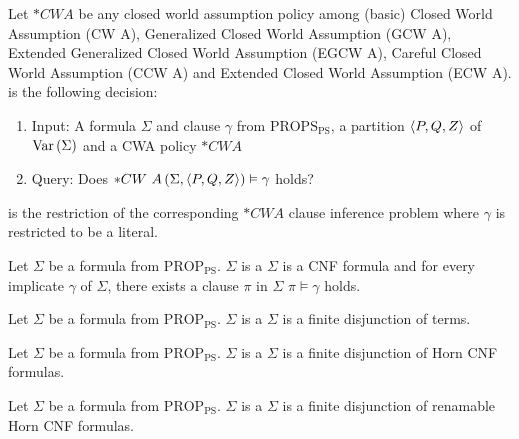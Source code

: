 \begin{defi}
Let $*CWA$ be any closed world assumption policy among (basic) Closed World Assumption (CW A), Generalized Closed World Assumption (GCW A), Extended Generalized Closed World Assumption (EGCW A), Careful Closed World Assumption (CCW A) and Extended Closed World Assumption (ECW A).   is the following decision:
\begin{enumerate}
 \item Input: A formula $\Sigma$ and clause $\gamma$ from $\mbox{PROPS}_{\mbox{PS}}$, a partition $\left\langle P,Q,Z\right\rangle$ of $\mbox{Var}\left(\Sigma\right)$ and a CWA policy $*CWA$
 \item Query: Does $\fun{*CW\ A}{\Sigma,\tuple{P,Q,Z}}\vDash\gamma$ holds?
\end{enumerate}
 is the restriction of the corresponding $*CWA$ clause inference problem where $\gamma$ is restricted to be a literal.
\cite{conf/ijcai/Coste-MarquisM99}
\end{defi}

\begin{defi}
Let $\Sigma$ be a formula from $\mbox{PROP}_{\mbox{PS}}$. $\Sigma$ is a  \iffTx{} $\Sigma$ is a CNF formula and for every implicate $\gamma$ of $\Sigma$, there exists a clause $\pi$ in $\Sigma$ \stTx{} $\pi\vDash\gamma$ holds.
\cite{conf/ijcai/Coste-MarquisM99}
\end{defi}

\begin{defi}
Let $\Sigma$ be a formula from $\mbox{PROP}_{\mbox{PS}}$. $\Sigma$ is a  \iffTx{} $\Sigma$ is a finite disjunction of terms.
\cite{conf/ijcai/Coste-MarquisM99}
\end{defi}

\begin{defi}
Let $\Sigma$ be a formula from $\mbox{PROP}_{\mbox{PS}}$. $\Sigma$ is a  \iffTx{} $\Sigma$ is a finite disjunction of Horn CNF formulas.
\cite{conf/ijcai/Coste-MarquisM99}
\end{defi}

\begin{defi}
Let $\Sigma$ be a formula from $\mbox{PROP}_{\mbox{PS}}$. $\Sigma$ is a  \iffTx{} $\Sigma$ is a finite disjunction of renamable Horn CNF formulas.
\cite{conf/ijcai/Coste-MarquisM99}
\end{defi}

